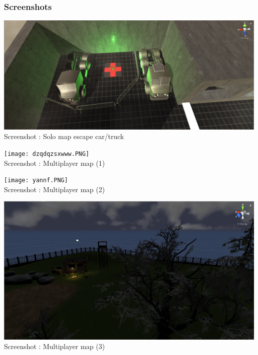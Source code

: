 \documentclass[12pt]{article}
\begin{document}
    	\subsubsection{Screenshots}
        
            \newpage
            \begin{center}	
            \includegraphics[scale = 0.40]{Solo_Map_Truck.png}\\[1cm]
            Screenshot : Solo map escape car/truck
            \end{center}
            \newpage
            
            \begin{center}	
            \texttt{[image: dzqdqzsxwww.PNG]}\\[1cm]
            Screenshot : Multiplayer map (1)
            \end{center}
            \newpage
            
            \begin{center}	
            \texttt{[image: yannf.PNG]}\\[1cm]
            Screenshot : Multiplayer map (2)
            \end{center}
            \newpage
            
            \begin{center}	
            \includegraphics[scale = 0.65]{zeaqeza.PNG}\\[1cm]
            Screenshot : Multiplayer map (3)
            \end{center}
            \newpage
        
\end{document}
